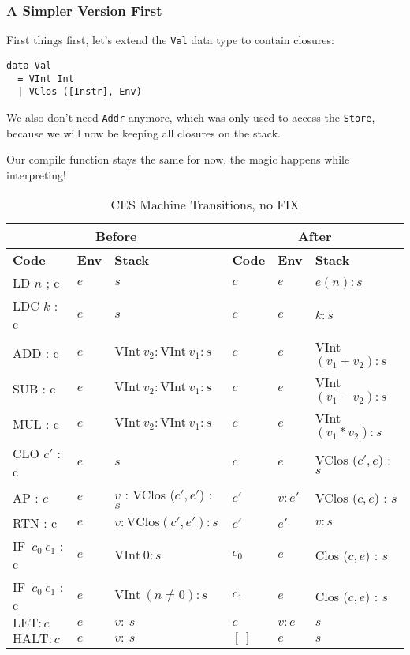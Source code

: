\subsubsection{A Simpler Version First}

First things first, let's extend the \texttt{Val} data type to contain closures:
\begin{lstlisting}
data Val
  = VInt Int
  | VClos ([Instr], Env)
\end{lstlisting}

We also don't need \texttt{Addr} anymore, which was only used to access the \texttt{Store},
because we will now be keeping all closures on the stack.

Our compile function stays the same for now, the magic happens while interpreting! \cite{CockettAM}

\begin{table}[h]
    \centering
    \begin{tabular}{|l|l|l||l|l|l|}
        \hline
        \multicolumn{3}{|c||}{\textbf{Before}} & \multicolumn{3}{c|}{\textbf{After}} \\
        \hline
        \textbf{Code} & \textbf{Env} & \textbf{Stack} & \textbf{Code} & \textbf{Env} & \textbf{Stack} \\
        \hline
        LD \(n\) ; c & \( e \) & \( s \) & \( c \) & \( e \) & \( e(n) : s \) \\
        LDC \(k\) : c & \( e \) & \( s \) & \( c \) & \( e \) & \( k : s \) \\
        ADD : c & \( e \) & \( \text{VInt} \ v_2 : \text{VInt} \ v_1 : s \) & \( c \) & \( e \) & VInt \( (v_1 + v_2) : s \) \\
        SUB : c & \( e \) & \( \text{VInt} \ v_2 : \text{VInt} \ v_1 : s \) & \( c \) & \( e \) & VInt \( (v_1 - v_2) : s \) \\
        MUL : c & \( e \) & \( \text{VInt} \ v_2 : \text{VInt} \ v_1 : s \) & \( c \) & \( e \) & VInt \( (v_1 * v_2) : s \) \\
        \hline
        CLO \(c'\) : c & \( e \) & \( s \) & \( c \) & \( e \) & VClos (\( c' , e \)) : \( s \) \\
        AP : \(c\) & \( e \) & \( v \) : VClos (\( c' , e' \)) : \( s \) & \( c' \) & \( v : e' \) & VClos (\( c , e \)) : \( s \) \\
        RTN : c & \( e \) & \( v : \text{VClos} (c', e') : s \) & \( c' \) & \( e' \) & \( v : s \) \\
        \hline
        IF\ \( c_0 \ c_1 \) : c & \( e \) & \( \text{VInt} \ 0 : s \) & \( c_0 \) & \( e \) & Clos (\( c, e \)) : \( s \) \\
        IF\ \( c_0 \ c_1 \) : c & \( e \) & \( \text{VInt} \ (n \neq 0) : s \) & \( c_1 \) & \( e \) & Clos (\( c, e \)) : \( s \) \\
        \hline
        \( \text{LET} : c \) & \( e \) & \( v : \ s \) & \( c \) & \( v : e \) & \( s \) \\
        \( \text{HALT} : c \) & \( e \) & \( v : \ s \) & \( [ \ ] \) & \( e \) & \( s \) \\
        \hline
    \end{tabular}
    \caption{CES Machine Transitions, no FIX}
\end{table}

